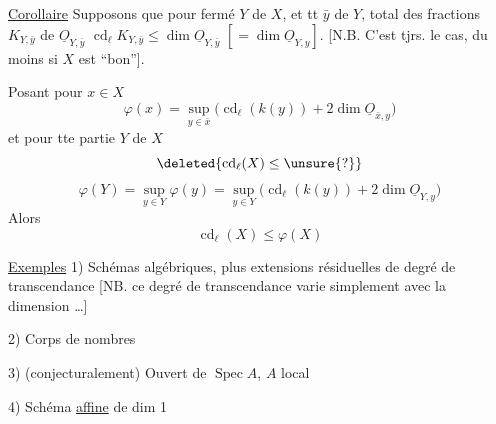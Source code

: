 \uline{Corollaire} Supposons que pour    fermé
 $Y$ de $X$, et tt   \uline{}
$\bar y$ de $Y$,   total des fractions $K_{Y,\bar y}$ de
$\underline O_{Y,\bar y}$   $\operatorname{cd}_{\ell}K_{Y,\bar y}\leq\dim\underline O_{Y,\bar y}$
$[=\dim\underline O_{Y,y}]$.  [N.B. C'est 
tjrs. le cas, du moins si $X$ est ``bon''].

Posant pour   $x\in X$
\[
\boxed{\varphi(x)=\sup_{y\in\bar x}\bigl(\operatorname{cd}_{\ell}(k(y))+2\dim\underline O_{\bar x,y}\bigr)}
\]
 et pour tte partie  $Y$ de $X$
\[
\deleted{\operatorname{cd}_{\ell}(X)\leq\unsure{?}}
\]
\[
\varphi(Y)=\sup_{y\in Y}\varphi(y)=\sup_{y\in Y}\bigl(\operatorname{cd}_{\ell}(k(y))+2\dim\underline O_{Y,y}\bigr)
\]
Alors
\[
\operatorname{cd}_{\ell}(X)\leq\varphi(X)
\]


\uline{Exemples} 1) Schémas algébriques, plus 
extensions résiduelles de degré de transcendance
 [NB. ce degré de transcendance varie
simplement avec la dimension \ldots]

2) Corps de nombres

3) (conjecturalement) Ouvert de $\operatorname{Spec} A$,
$A$  local

4) Schéma  \uline{affine} de dim 1
